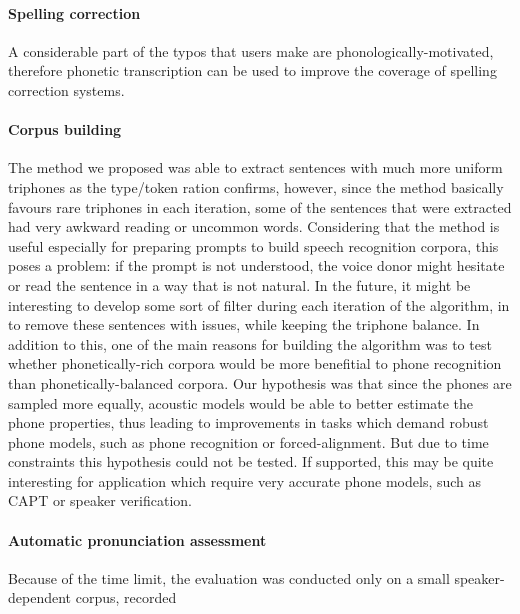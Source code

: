 \paragraph*{Spelling correction}
A considerable part of the typos that users make are phonologically-motivated, therefore phonetic transcription can be used to improve the coverage of spelling correction systems.

\paragraph*{Corpus building}
The method we proposed was able to extract sentences with much more uniform triphones as the type/token ration confirms, however, since the method basically favours rare triphones in each iteration, some of the sentences that were extracted had very awkward reading or uncommon words. Considering that the method is useful especially for preparing prompts to build speech recognition corpora, this poses a problem: if the prompt is not understood, the voice donor might hesitate or read the sentence in a way that is not natural. In the future, it might be interesting to develop some sort of filter during each iteration of the algorithm, in to remove these sentences with issues, while keeping the triphone balance. In addition to this, one of the main reasons for building the algorithm was to test whether phonetically-rich corpora would be more benefitial to phone recognition than phonetically-balanced corpora. Our hypothesis was that  since the phones are sampled more equally, acoustic models would be able to better estimate the phone properties, thus leading to improvements in tasks which demand robust phone models, such as phone recognition or forced-alignment. But due to time constraints this hypothesis could not be tested. If supported, this may be quite interesting for application which require very accurate phone models, such as \ac{CAPT} or speaker verification.

\paragraph*{Automatic pronunciation assessment}
Because of the time limit, the evaluation was conducted only on a small speaker-dependent corpus, recorded 





